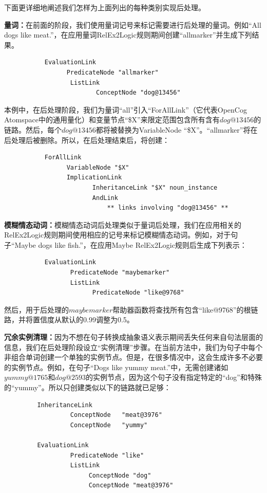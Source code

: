 下面更详细地阐述我们怎样为上面列出的每种类别实现后处理。

{\bf 量词：}在前面的阶段，我们使用量词记号来标记需要进行后处理的量词。例如“All dogs like meat.”，在应用量词RelEx2Logic规则期间创建“allmarker”并生成下列结果。

\begin{verbatim}
           EvaluationLink
                 PredicateNode "allmarker"
                  ListLink
                         ConceptNode "dog@13456"
\end{verbatim}

本例中，在后处理阶段，我们为量词“all”引入“ForAllLink”（它代表OpenCog Atomspace中的通用量化）和变量节点“\$X”来限定范围包含所有含有$dog@13456$的链路。然后，每个$dog@13456$都将被替换为VariableNode “\$X”。“allmarker”将在后处理后被删除。所以，在后处理结束后，将创建：

\begin{verbatim}
           ForAllLink
                 VariableNode "$X"
                 ImplicationLink 
                        InheritanceLink "$X" noun_instance
                        AndLink
                            ** links involving "dog@13456" **
\end{verbatim}

{\bf 模糊情态动词：}模糊情态动词后处理类似于量词后处理，我们在应用相关的RelEx2Logic规则期间使用相应的记号来标记模糊情态动词。例如，对于句子“Maybe dogs like fish.”，在应用Maybe RelEx2Logic规则后生成下列表示：

\begin{verbatim}
           EvaluationLink
                  PredicateNode "maybemarker"
                  ListLink
                        PredicateNode "like@9768"
\end{verbatim}

然后，用于后处理的$maybemarker$帮助器函数将查找所有包含“like@9768”的根链路，并将置信度从默认的0.99调整为0.5。

{\bf 冗余实例清理：}因为不想在句子转换成抽象语义表示期间丢失任何来自句法层面的信息，我们在后处理阶段设立“实例清理”步骤。在当前方法中，我们为句子中每个非组合单词创建一个单独的实例节点。但是，在很多情况中，这会生成许多不必要的实例节点。例如，在句子“Dogs like yummy meat.”中，无需创建诸如$yummy@1765$和$dog@2593$的实例节点，因为这个句子没有指定特定的“dog”和特殊的“yummy”。所以只创建类似以下的链路就已足够：

\begin{verbatim}
         InheritanceLink 
                  ConceptNode   "meat@3976" 
                  ConceptNode   "yummy"

         EvaluationLink 
                  PredicateNode "like"
                  ListLink
                       ConceptNode "dog"
                       ConceptNode "meat@3976"
\end{verbatim}

